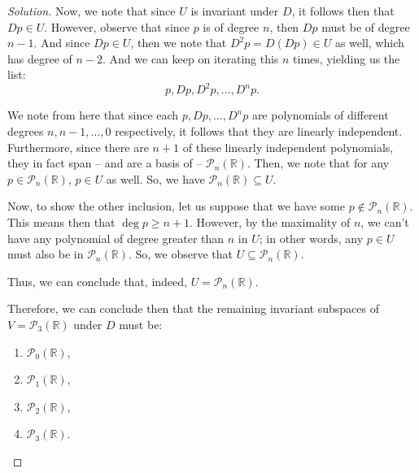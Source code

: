 \documentclass{article}
\newenvironment{solution}{\begin{proof}[Solution]}{\end{proof}}
\newcommand{\RR}{\mathbb{R}}
\begin{document}
\begin{solution}
\begin{comment}
			Now, suppose that $n \geq 0$. Then, there exists some polynomial $p \in U$ whose greatest degree is $n$.
		\end{comment}
		Now, we note that since $U$ is invariant under $D$, it follows then that $Dp \in U$. However, observe that since $p$ is of degree $n$, then $Dp$ must be of degree $n-1$. And since $Dp \in U$, then we note that $D^{2}p = D(Dp) \in U$ as well, which has degree of $n-2$. And we can keep on iterating this $n$ times, yielding us the list:
		\begin{equation*}
			p, Dp, D^{2}p, \ldots, D^{n}p.
		\end{equation*}
	
		We note from here that since each $p, Dp, \ldots, D^{n}p$ are polynomials of different degrees $n, n-1, \ldots, 0$ respectively, it follows that they are linearly independent. Furthermore, since there are $n + 1$ of these linearly independent polynomials, they in fact span -- and are a basis of -- $\mathscr{P}_{n}(\RR)$. Then, we note that for any $p \in \mathscr{P}_{n}(\RR)$, $p \in U$ as well. So, we have $\mathscr{P}_{n}(\RR) \subseteq U$.
		
		Now, to show the other inclusion, let us suppose that we have some $p \not\in \mathscr{P}_{n}(\RR)$. This means then that $\deg p \geq n + 1$. However, by the maximality of $n$, we can't have any polynomial of degree greater than $n$ in $U$; in other words, any $p \in U$ must also be in $\mathscr{P}_{n}(\RR)$. So, we observe that $U \subseteq \mathscr{P}_{n}(\RR)$.
		
		Thus, we can conclude that, indeed, $U = \mathscr{P}_{n}(\RR)$.
		
		Therefore, we can conclude then that the remaining invariant subspaces of $V = \mathscr{P}_{3}(\RR)$ under $D$ must be:
		\begin{enumerate}
			\item $\mathscr{P}_{0}(\RR)$,
			\item $\mathscr{P}_{1}(\RR)$,
			\item $\mathscr P_{2}(\RR)$,
			\item $\mathscr{P}_{3}(\RR)$.
		\end{enumerate}
		
	\end{solution}

	\newpage
	
\end{document}
